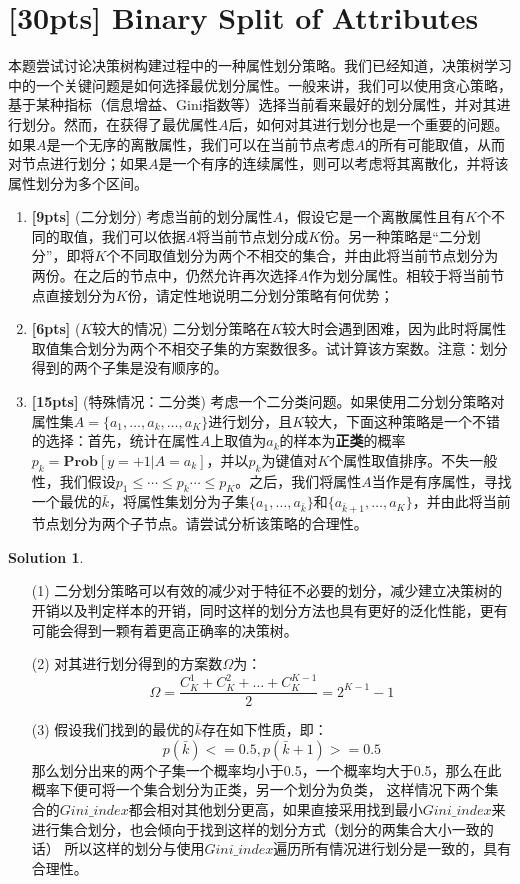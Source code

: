\documentclass[a4paper,UTF8]{article}
\theoremstyle{definition}
\newtheorem*{solution}{Solution}
\begin{document}
\newpage

\section{[30pts] Binary Split of Attributes}
本题尝试讨论决策树构建过程中的一种属性划分策略。我们已经知道，决策树学习中的一个关键问题是如何选择最优划分属性。一般来讲，我们可以使用贪心策略，基于某种指标（信息增益、Gini指数等）选择当前看来最好的划分属性，并对其进行划分。然而，在获得了最优属性$A$后，如何对其进行划分也是一个重要的问题。如果$A$是一个无序的离散属性，我们可以在当前节点考虑$A$的所有可能取值，从而对节点进行划分；如果$A$是一个有序的连续属性，则可以考虑将其离散化，并将该属性划分为多个区间。
\begin{enumerate}[(1)]
	\item \textbf{[9pts]} (二分划分) 考虑当前的划分属性$A$，假设它是一个离散属性且有$K$个不同的取值，我们可以依据$A$将当前节点划分成$K$份。另一种策略是“二分划分”，即将$K$个不同取值划分为两个不相交的集合，并由此将当前节点划分为两份。在之后的节点中，仍然允许再次选择$A$作为划分属性。相较于将当前节点直接划分为$K$份，请定性地说明二分划分策略有何优势；
	\item \textbf{[6pts]} ($K$较大的情况) 二分划分策略在$K$较大时会遇到困难，因为此时将属性取值集合划分为两个不相交子集的方案数很多。试计算该方案数。注意：划分得到的两个子集是没有顺序的。
	\item \textbf{[15pts]} (特殊情况：二分类) 考虑一个二分类问题。如果使用二分划分策略对属性集$A=\{a_1,\ldots,a_k,\ldots,a_K\}$进行划分，且$K$较大，下面这种策略是一个不错的选择：首先，统计在属性$A$上取值为$a_k$的样本为\textbf{正类}的概率$p_k=\textbf{Prob}[y=+1|A=a_k]$，并以$p_k$为键值对$K$个属性取值排序。不失一般性，我们假设$p_1\leq\cdots\leq p_k\cdots\leq p_K$。之后，我们将属性$A$当作是有序属性，寻找一个最优的$\bar{k}$，将属性集划分为子集$\{a_1,\ldots,a_{\bar{k}}\}$和$\{a_{\bar{k}+1},\ldots,a_K\}$，并由此将当前节点划分为两个子节点。请尝试分析该策略的合理性。
\end{enumerate}

\begin{solution}
	\begin{enumerate}
		\item [(1)]
		      二分划分策略可以有效的减少对于特征不必要的划分，减少建立决策树的开销以及判定样本的开销，同时这样的划分方法也具有更好的泛化性能，更有可能会得到一颗有着更高正确率的决策树。
		\item [(2)]
		      对其进行划分得到的方案数$\Omega$为：
		      \[\Omega = \frac{C_K^1+C_K^2+\ldots+C_K^{K-1}}{2}=2^{K-1}-1\]
		\item [(3)]
		      假设我们找到的最优的$\bar{k}$存在如下性质，即：
		      \[p(\bar{k})<=0.5,p(\bar{k}+1)>=0.5\]
		      那么划分出来的两个子集一个概率均小于0.5，一个概率均大于0.5，那么在此概率下便可将一个集合划分为正类，另一个划分为负类，
		      这样情况下两个集合的$Gini\_index$都会相对其他划分更高，如果直接采用找到最小$Gini\_index$来进行集合划分，也会倾向于找到这样的划分方式（划分的两集合大小一致的话）
		      所以这样的划分与使用$Gini\_index$遍历所有情况进行划分是一致的，具有合理性。
	\end{enumerate}
\end{solution}
\end{document}
